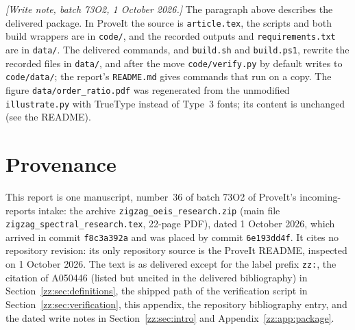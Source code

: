 \documentclass[11pt,a4paper]{article}
\theoremstyle{definition}
\begin{document}
\emph{[Write note, batch 73O2, 1 October 2026.]} The paragraph above
describes the delivered package. In ProveIt the source is
\texttt{article.tex}, the scripts and both build wrappers are in
\texttt{code/}, and the recorded outputs and \texttt{requirements.txt} are
in \texttt{data/}. The delivered commands, and \texttt{build.sh} and
\texttt{build.ps1}, rewrite the recorded files in \texttt{data/}, and after
the move \texttt{code/verify.py} by default writes to \texttt{code/data/};
the report's \texttt{README.md} gives commands that run on a copy. The
figure \texttt{data/order\_ratio.pdf} was regenerated from the unmodified
\texttt{illustrate.py} with TrueType instead of Type~3 fonts; its content is
unchanged (see the README).

\section{Provenance}
\label{zz:sec:provenance}
This report is one manuscript, number~36 of batch 73O2 of ProveIt's
incoming-reports intake: the archive \texttt{zigzag\_oeis\_research.zip}
(main file \texttt{zigzag\_spectral\_research.tex}, 22-page PDF), dated
1 October 2026, which arrived in commit \texttt{f8c3a392a} and was placed by
commit \texttt{6e193dd4f}. It cites no repository revision: its only
repository source is the ProveIt README, inspected on 1 October 2026. The
text is as delivered except for the label prefix \texttt{zz:}, the citation
of A050446 (listed but uncited in the delivered bibliography) in
Section~\ref{zz:sec:definitions}, the shipped path of the verification
script in Section~\ref{zz:sec:verification}, this appendix, the
repository bibliography entry, and the dated write notes in
Section~\ref{zz:sec:intro} and Appendix~\ref{zz:app:package}.
\end{document}
